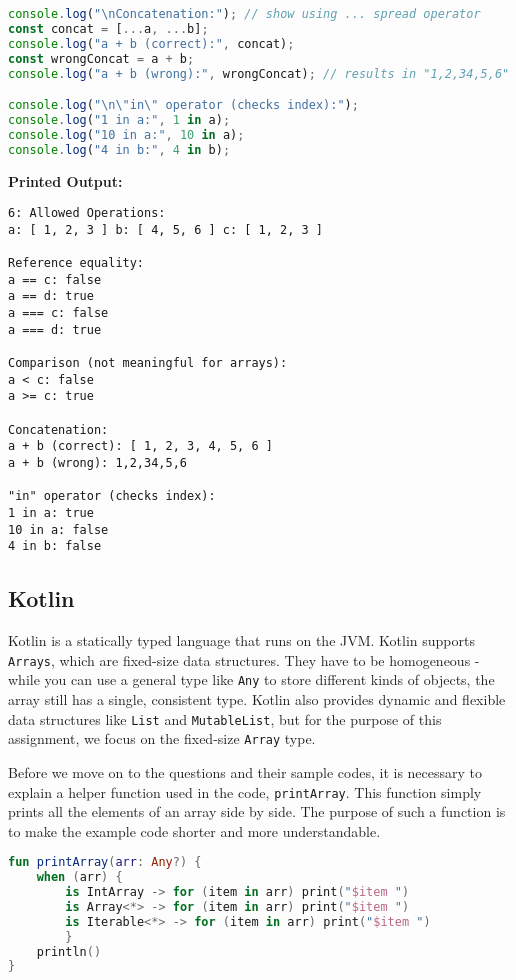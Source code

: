 \documentclass{article}
\begin{document}
\begin{itemize}
\begin{lstlisting}[language=JavaScript]
console.log("\nConcatenation:"); // show using ... spread operator
const concat = [...a, ...b];
console.log("a + b (correct):", concat);
const wrongConcat = a + b;
console.log("a + b (wrong):", wrongConcat); // results in "1,2,34,5,6" – string

console.log("\n\"in\" operator (checks index):");
console.log("1 in a:", 1 in a); 
console.log("10 in a:", 10 in a); 
console.log("4 in b:", 4 in b);

\end{lstlisting}
\textbf{Printed Output:}
\begin{verbatim}
6: Allowed Operations:
a: [ 1, 2, 3 ] b: [ 4, 5, 6 ] c: [ 1, 2, 3 ]

Reference equality:
a == c: false
a == d: true
a === c: false
a === d: true

Comparison (not meaningful for arrays):
a < c: false
a >= c: true

Concatenation:
a + b (correct): [ 1, 2, 3, 4, 5, 6 ]
a + b (wrong): 1,2,34,5,6

"in" operator (checks index):
1 in a: true
10 in a: false
4 in b: false
\end{verbatim}

\end{itemize}
\newpage




\subsection{Kotlin}
Kotlin is a statically typed language that runs on the JVM. Kotlin supports \texttt{Arrays}, which are fixed-size data structures. They have to be homogeneous \mbox{-} while you can use a general type like \texttt{Any} to store different kinds of objects, the array still has a single, consistent type. Kotlin also provides dynamic and flexible data structures like \texttt{List} and \texttt{MutableList}, but for the purpose of this assignment, we focus on the fixed-size \texttt{Array} type.

Before we move on to the questions and their sample codes, it is necessary to explain a helper function used in the code, \texttt{printArray}. This function simply prints all the elements of an array side by side. The purpose of such a function is to make the example code shorter and more understandable.
\begin{lstlisting}[language=Kotlin]
fun printArray(arr: Any?) {
    when (arr) {
        is IntArray -> for (item in arr) print("$item ")
        is Array<*> -> for (item in arr) print("$item ")
        is Iterable<*> -> for (item in arr) print("$item ")
        }
    println()
}
\end{lstlisting}
\end{document}
